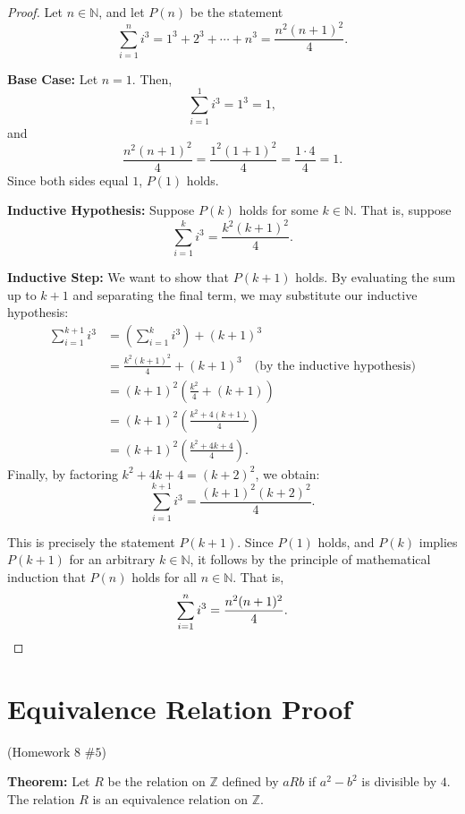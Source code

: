 \documentclass[12pt]{amsart}
\begin{document}
\begin{proof}
Let $n \in \mathbb{N}$, and let $P(n)$ be the statement
\[
    \sum_{i=1}^{n} i^3 = 1^3 + 2^3 + \cdots + n^3 = \frac{n^2(n+1)^2}{4}.
\]

\textbf{Base Case:} Let $n = 1$. Then,
\[
    \sum_{i=1}^{1} i^3 = 1^3 = 1,
\]
and
\[
    \frac{n^2(n+1)^2}{4} = \frac{1^2(1+1)^2}{4} = \frac{1 \cdot 4}{4} = 1.
\]
Since both sides equal $1$, $P(1)$ holds.

\textbf{Inductive Hypothesis:} Suppose $P(k)$ holds for some $k \in \mathbb{N}$.
That is, suppose
\[
    \sum_{i=1}^{k} i^3 = \frac{k^2(k+1)^2}{4}.
\]

\textbf{Inductive Step:} We want to show that $P(k+1)$ holds. By evaluating the sum up to $k+1$ and separating the final term, we may substitute our inductive hypothesis:
\begin{align*}
    \sum_{i=1}^{k+1}i^3 
        &= \left(\sum_{i=1}^{k}i^3\right) + (k+1)^3 \\
        &= \frac{k^2(k+1)^2}{4} + (k+1)^3 \quad \text{(by the inductive hypothesis)} \\
        &= (k+1)^2 \left(\frac{k^2}{4} + (k+1)\right) \\
        &= (k+1)^2 \left(\frac{k^2 + 4(k+1)}{4}\right) \\
        &= (k+1)^2 \left(\frac{k^2 + 4k + 4}{4}\right).
\end{align*}
Finally, by factoring $k^2+4k+4 = (k+2)^2$, we obtain:
\[
    \sum_{i=1}^{k+1}i^3 = \frac{(k+1)^2(k+2)^2}{4}.
\]

\nopagebreak[4]
This is precisely the statement $P(k+1)$. Since $P(1)$ holds, and $P(k)$ implies $P(k+1)$ for an arbitrary $k \in \mathbb{N}$, it follows by the principle of mathematical induction that $P(n)$ holds for all $n \in \mathbb{N}$. That is,
\[
    \sum_{i=1}^{n} i^3 = \frac{n^2(n+1)^2}{4}. \qedhere
\]
\end{proof}

\newpage
\section{Equivalence Relation Proof}
\begin{center}(Homework 8 $\#5$)\end{center}

\textbf{Theorem:} Let $R$ be the relation on $\mathbb{Z}$ defined by $aRb$ if $a^2-b^2$ is divisible by $4$. The relation $R$ is an equivalence relation on $\mathbb{Z}$.
\end{document}
